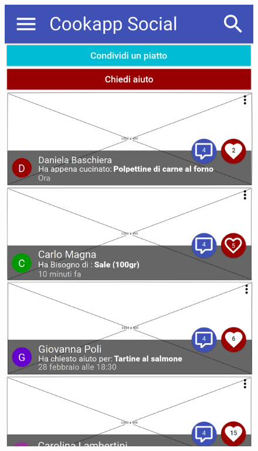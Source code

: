 \begin{figure}[H]
	\begin{minipage}{.49\textwidth}
		\includegraphics[width=\textwidth]{img/wireframe/homepage_social.png}
	\end{minipage}
	\begin{minipage}{.49\textwidth}

\end{minipage}
\end{figure}
